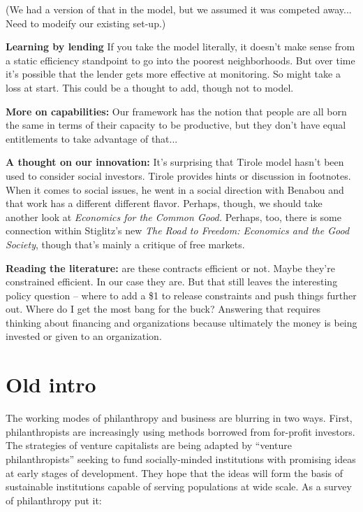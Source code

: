 \documentclass[letterpaper, 12pt]{article}
\begin{document}
(We had a version of that in the model, but we assumed it was competed away... Need to modeify our existing set-up.)

\textbf{Learning by lending} If you take the model literally, it doesn't make sense from a static efficiency standpoint to go into the poorest neighborhoods. But over time it's possible that the lender gets more effective at monitoring. So might take a loss at start. This could be a thought to add, though not to model.

\textbf{More on capabilities:}
Our framework has the notion that people are all born the same in terms of their capacity to be productive, but they don't have equal entitlements to take advantage of that... 

\textbf{A thought on our innovation:} It's surprising that Tirole model hasn't been used to consider social investors. Tirole provides hints or discussion in footnotes. When it comes to social issues, he went in a social direction with Benabou and that work has a different different flavor. Perhaps, though, we should take another look at \textit{Economics for the Common Good.} Perhaps, too, there is some connection within Stiglitz's new \textit{The Road to Freedom: Economics and the Good Society}, though that's mainly a critique of free markets.

\textbf{Reading the literature:} are these contracts efficient or not. Maybe they're constrained efficient. In our case they are. But that still leaves the interesting policy question -- where to add a \$1 to release constraints and push things further out. Where do I get the most bang for the buck? Answering that requires thinking about financing and organizations because ultimately the money is being invested or given to an organization.



\section{Old intro}
The working modes of philanthropy and business are blurring in two ways. First, philanthropists are increasingly using methods borrowed from for-profit investors. The strategies of venture capitalists are being adapted by ``venture philanthropists'' seeking to fund socially-minded institutions with promising ideas at early stages of development. They hope that the ideas will form the basis of sustainable institutions capable of serving populations at wide scale. As a survey of philanthropy put it:
\end{document}
